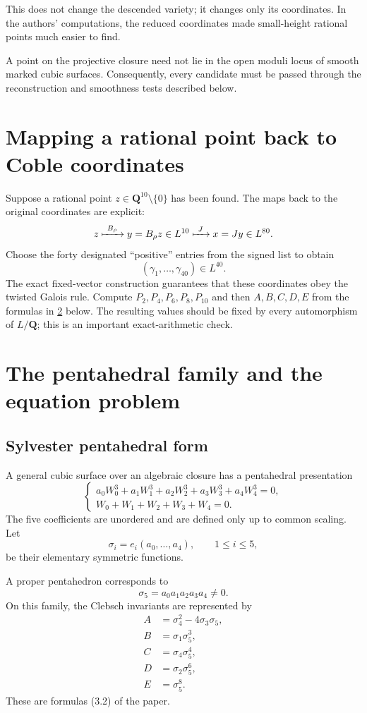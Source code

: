 \documentclass[11pt]{article}
\newcommand{\QQ}{\mathbf{Q}}
\begin{document}
This does not change the descended variety; it changes only its coordinates.
In the authors' computations, the reduced coordinates made small-height
rational points much easier to find.

A point on the projective closure need not lie in the open moduli locus of
smooth marked cubic surfaces.  Consequently, every candidate must be passed
through the reconstruction and smoothness tests described below.

\section{Mapping a rational point back to Coble coordinates}

Suppose a rational point $z\in\QQ^{10}\setminus\{0\}$ has been found.  The
maps back to the original coordinates are explicit:
\[
  z
  \xmapsto{\ B_{\rho}\ }
  y=B_{\rho}z\in L^{10}
  \xmapsto{\ J\ }
  x=Jy\in L^{80}.
\]
Choose the forty designated ``positive'' entries from the signed list to
obtain
\[
  (\gamma_1,\ldots,\gamma_{40})\in L^{40}.
\]
The exact fixed-vector construction guarantees that these coordinates obey
the twisted Galois rule.  Compute $P_2,P_4,P_6,P_8,P_{10}$ and then
$A,B,C,D,E$ from the formulas in \cref{sec:clebsch-operational} below.
The resulting values should be fixed by every automorphism of $L/\QQ$; this
is an important exact-arithmetic check.

\section{The pentahedral family and the equation problem}
\label{sec:clebsch-operational}

\subsection{Sylvester pentahedral form}

A general cubic surface over an algebraic closure has a pentahedral
presentation
\[
\begin{cases}
 a_0W_0^3+a_1W_1^3+a_2W_2^3+a_3W_3^3+a_4W_4^3=0,\\
 W_0+W_1+W_2+W_3+W_4=0.
\end{cases}
\]
The five coefficients are unordered and are defined only up to common
scaling.  Let
\[
  \sigma_i=e_i(a_0,\ldots,a_4),
  \qquad 1\leq i\leq5,
\]
be their elementary symmetric functions.

A proper pentahedron corresponds to
\[
  \sigma_5=a_0a_1a_2a_3a_4\neq0.
\]
On this family, the Clebsch invariants are represented by
\[
\begin{aligned}
 A&=\sigma_4^2-4\sigma_3\sigma_5,\\
 B&=\sigma_1\sigma_5^3,\\
 C&=\sigma_4\sigma_5^4,\\
 D&=\sigma_2\sigma_5^6,\\
 E&=\sigma_5^8.
\end{aligned}
\]
These are formulas (3.2) of the paper.
\end{document}
